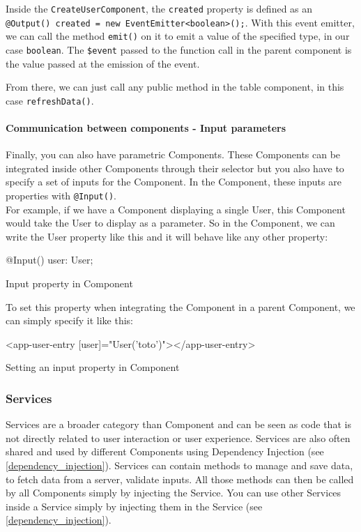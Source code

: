 \documentclass[11pt,a4paper]{report}
\newenvironment{code}{\captionsetup{type=listing}}{}
\begin{document}
Inside the \verb+CreateUserComponent+, the \verb+created+ property is defined as an \texttt{@Output() created = new EventEmitter<boolean>();}. With this event emitter, we can call the method \verb+emit()+ on it to emit a value of the specified type, in our case \verb+boolean+. The \verb+$event+ passed to the function call in the parent component is the value passed at the emission of the event.

From there, we can just call any public method in the table component, in this case \verb+refreshData()+.

\paragraph{Communication between components - Input parameters}
Finally, you can also have parametric Components. These Components can be integrated inside other Components through their selector but you also have to specify a set of inputs for the Component. In the Component, these inputs are properties with \verb+@Input()+. \\

For example, if we have a Component displaying a single User, this Component would take the User to display as a parameter. So in the Component, we can write the User property like this and it will behave like any other property:
\begin{code}
	\begin{inlinets}
@Input() user: User;
	\end{inlinets}
	\caption{Input property in Component}
\end{code}

To set this property when integrating the Component in a parent Component, we can simply specify it like this:
\begin{code}
	\begin{inlinehtml}
<app-user-entry [user]="User('toto')"></app-user-entry>
	\end{inlinehtml}
	\caption{Setting an input property in Component}
\end{code}
\subsubsection{Services}
Services\cite{angular:doc:services} are a broader category than Component and can be seen as code that is not directly related to user interaction or user experience. Services are also often shared and used by different Components using Dependency Injection\cite{angular:doc:dependency_injection} (see \ref{dependency_injection}). Services can contain methods to manage and save data, to fetch data from a server, validate inputs. All those methods can then be called by all Components simply by injecting the Service. You can use other Services inside a Service simply by injecting them in the Service (see \ref{dependency_injection}).\\
\end{document}
